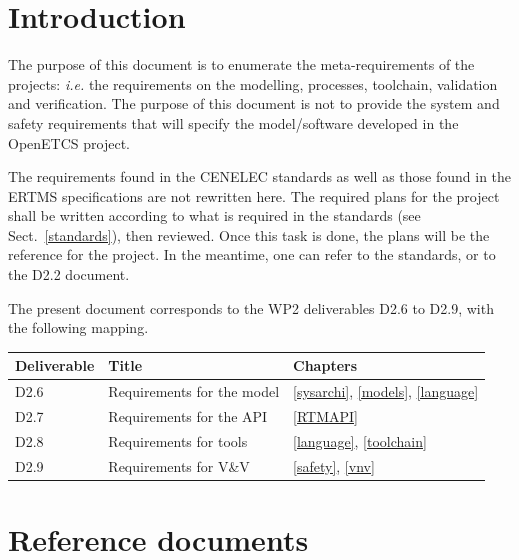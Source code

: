 \documentclass{template/openetcs_article}
\begin{document}
\newenvironment{comment}{
	\begin{quote}
	\begin{itshape}Comment. 
}{
	\end{itshape}
	\end{quote}
}

\newenvironment{justif}{
	\begin{quote}
	\begin{itshape}Justification. 
}{
	\end{itshape}
	\end{quote}
}


\def\reqt{R-WP2/D2.6}


\section{Introduction}
The purpose of this document is to enumerate the meta-requirements of the projects: \emph{i.e.} 
the requirements on the modelling, processes, toolchain, validation and verification. 
The purpose of this document is 
not to provide the system and safety requirements that will specify the model/software 
developed in the OpenETCS project.

The requirements found in the CENELEC standards as well as those found in the ERTMS specifications
are not rewritten here. The required plans for the 
project shall be written according to what is required in the standards (see Sect.~\ref{standards}),
then reviewed. Once this task is done, the plans will be the reference for the project.
In the meantime, one can refer to the standards, or to the D2.2 document.

The present document corresponds to the WP2 deliverables D2.6 to D2.9, with the following mapping.

\begin{tabular}{|lll|}
\hline
Deliverable & Title & Chapters \\
\hline
D2.6 & Requirements for the model & \ref{sysarchi}, \ref{models}, \ref{language} \\
\hline
D2.7 & Requirements for the API & \ref{RTMAPI} \\
\hline
D2.8 & Requirements for tools & \ref{language}, \ref{toolchain} \\
\hline
D2.9 & Requirements for V\&V & \ref{safety}, \ref{vnv}\\
\hline
\end{tabular}

\section{Reference documents}
\end{document}
